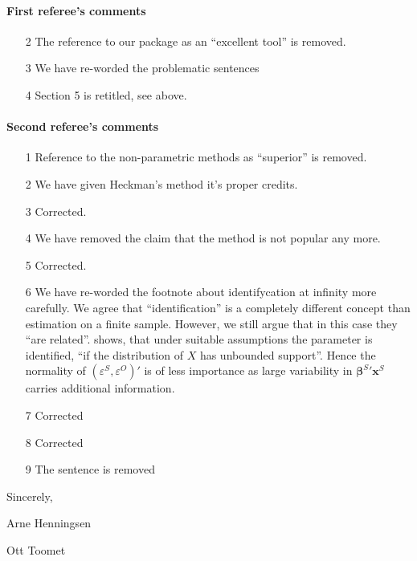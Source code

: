 \documentclass[a4paper]{article}
\renewcommand*{\vec}[1]{\boldsymbol{#1}}%
\begin{document}
\paragraph{First referee's comments}

\begin{itemize}
\item[2] The reference to our package as an ``excellent tool'' is removed.
\item[3] We have re-worded the problematic sentences
\item[4] Section 5 is retitled, see above.
\end{itemize}

\paragraph{Second referee's comments}

\begin{itemize}
\item[1] Reference to the non-parametric methods as ``superior'' is
  removed.
\item[2] We have given Heckman's method it's proper credits.
\item[3] Corrected.
\item[4] We have removed the claim that the method is not popular any more.
\item[5] Corrected.
\item[6] We have re-worded the footnote about identifycation at
  infinity more carefully.  We agree that ``identification'' is a
  completely different concept than estimation on a finite sample.
  However, we still argue that in this case they ``are related''.
  \cite[p. 205]{chamberlain1986} shows, that under suitable
  assumptions the parameter is identified, ``if the distribution of
  $X$ has unbounded support''.  Hence the normality of
  $(\varepsilon^{S}, \varepsilon^{O})'$ is of less importance as large
  variability in ${\vec{\beta}^{S}}' \vec{x}^{S}$ carries additional
  information.
\item[7] Corrected
\item[8] Corrected
\item[9] The sentence is removed
\end{itemize}

\bigskip

Sincerely,

\bigskip

Arne Henningsen

Ott Toomet



\end{document}
